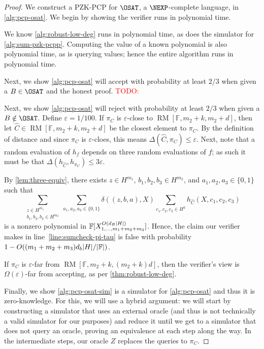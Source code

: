 \documentclass[english,12pt]{reedthesis}
\theoremstyle{plain}
\theoremstyle{definition}
\theoremstyle{remark}
\DeclareMathOperator{\RM}{RM}
\DeclarePairedDelimiter{\abs}{\lvert}{\rvert}
\newcommand{\TODO}[1]{\textcolor{red}{TODO: #1}}
\begin{document}
\begin{proof}
  We construct a PZK-PCP for $\OSAT$, a $\NEXP$-complete language, in
  \cref{alg:pcp-osat}. We begin by showing the verifier runs in polynomial
  time.

  We know \cref{alg:robust-low-deg} runs in polynomial time, as does the
  simulator for \cref{alg:sum-pzk-pcpp}. Computing the value of a known
  polynomial is also polynomial time, as is querying values; hence the entire
  algorithm runs in polynomial time.

  Next, we show \cref{alg:pcp-osat} will accept with probability at least $2/3$
  when given a $B \in \OSAT$ and the honest proof. \TODO{}

  Next, we show \cref{alg:pcp-osat} will reject with probability at least $2/3$
  when given a $B \notin \OSAT$. Define $\varepsilon = 1/100$. If $\pi_{C}$ is $\varepsilon$-close to
  $\RM[\mathbb{F}, m_{2}+k, m_{2}+d]$, then let
  $\hat{C} \in \RM[\mathbb{F}, m_{2}+k, m_{2}+d]$ be the closest element to
  $\pi_{C}$. By the definition of distance and since $\pi_{C}$ is $\varepsilon$-cloes, this
  means $\Delta(\hat{C}, \pi_{C}) \le \varepsilon$. Next, note that a random evaluation of $h_{f}$
  depends on three random evaluations of $f$; as such it must be that
  $\Delta(h_{\hat{C}}, h_{\pi_{C}}) \le 3\varepsilon$.

  By \cref{lem:three-equiv}, there exists $z \in H^{m_{1}}$,
  $b_{1}, b_{2}, b_{3} \in H^{m_{2}}$, and $a_{1}, a_{2}, a_{3} \in \{0, 1\}$ such
  that
  \begin{equation}
    \sum_{\substack{z \in H^{m_{1}} \\ b_{1}, b_{2}, b_{3} \in H^{m_{2}}}}\sum_{a_{1}, a_{2}, a_{3} \in \{0, 1\}}
    \delta((z, b, a), X)\sum_{c_{1}, c_{2}, c_{3} \in H^{k}}h_{\hat{C}}(X, c_{1}, c_{2}, c_{3})
  \end{equation}
  is a nonzero polynomial in
  $\mathbb{F}[X_{1, \ldots, m_{1}+m_{2}+m_{3}}^{O(d_{B}\abs{H})}]$. Hence, the claim
  our verifier makes in line~\ref{line:sumcheck-pi-tau} is false with
  probability $1 - O((m_{1}+m_{2}+m_{3})d_{b}\abs{H}/\abs{\mathbb{F}})$.

  If $\pi_{C}$ is $\varepsilon$-far from $\RM[\mathbb{F}, m_{2}+k, (m_{2}+k)d]$, then the
  verifier's view is $\Omega(\varepsilon)$-far from accepting, as per
  \cref{thm:robust-low-deg}.

  Finally, we show \cref{alg:pcp-osat-sim} is a simulator for
  \cref{alg:pcp-osat} and thus it is zero-knowledge. For this, we will use a
  hybrid argument: we will start by constructing a simulator that uses an
  external oracle (and thus is not technically a valid simulator for our
  purposes) and reduce it until we get to a simulator that does not query an
  oracle, proving an equivalence at each step along the way. In the intermediate
  steps, our oracle $Z$ replaces the queries to $\pi_{C}$.


\end{proof}
\end{document}
